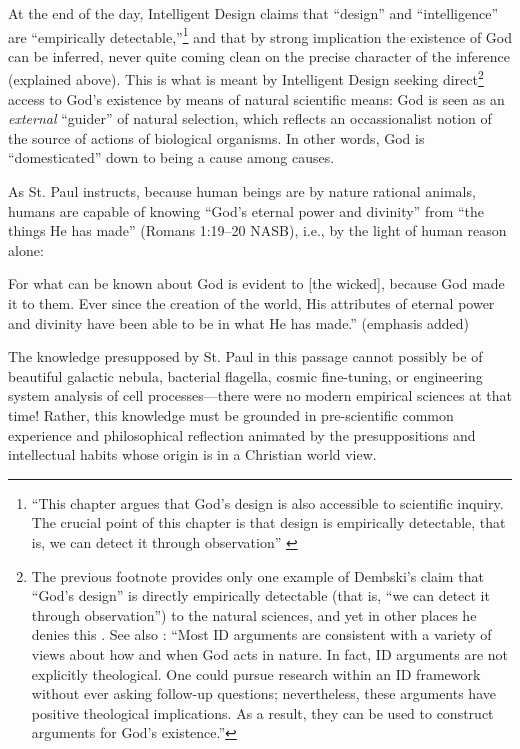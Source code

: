 At the end of the day, Intelligent Design claims that “design” and “intelligence” are “empirically detectable,”\footnote{%
“This chapter argues that God’s design is also accessible to scientific inquiry. The crucial point of this chapter is that design is empirically detectable, that is, we can detect it through observation” \citep[][p.~17]{dembski2002}
} and that by strong implication the existence of God can be inferred, never quite coming clean on the precise character of the inference (explained above). This is what is meant by Intelligent Design seeking direct\footnote{%
The previous footnote provides only one example of Dembski’s claim that “God’s design” is directly empirically detectable (that is, “we can detect it through observation”) to the natural sciences, and yet in other places he denies this \citep[][pp.~107--108]{dembski2002}. See also \citet[][p.~205]{richards2010c}:
“Most ID arguments are consistent with a variety of views about how and when God acts in nature. In fact, ID arguments are not explicitly theological. One could pursue research within an ID framework without ever asking follow-up questions; nevertheless, these arguments have positive theological implications. As a result, they can be used to construct arguments for God’s existence.”
} access to God’s existence by means of natural scientific means: God is seen as an \textit{external} ``guider'' of natural selection, which reflects an occassionalist notion of the source of actions of biological organisms. In other words, God is “domesticated” down to being a cause among causes.


As St. Paul instructs, because human beings are by nature rational animals, humans are capable of knowing ``God's eternal power and divinity'' from ``the things He has made'' (Romans 1:19--20 NASB), i.e., by the light of human reason alone:

\begin{quoting}
For what can be known about God is evident to [the wicked], because God made it  to them. Ever since the creation of the world, His  attributes of eternal power and divinity have been able to be  in what He has made.'' (emphasis added)
\end{quoting}

The knowledge presupposed by St. Paul in this passage cannot possibly be of beautiful galactic nebula, bacterial flagella, cosmic fine-tuning, or engineering system analysis of cell processes---there were no modern empirical sciences at that time! Rather, this knowledge must be grounded in pre-scientific common experience and philosophical reflection animated by the presuppositions and intellectual habits whose origin is in a Christian world view.

